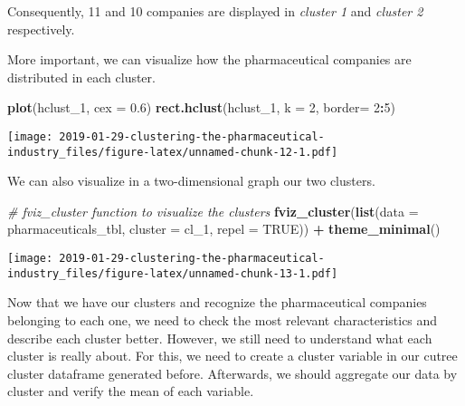\documentclass[]{article}
\newenvironment{Shaded}{\begin{snugshade}}{\end{snugshade}}
\newcommand{\KeywordTok}[1]{\textcolor[rgb]{0.13,0.29,0.53}{\textbf{#1}}}
\newcommand{\DataTypeTok}[1]{\textcolor[rgb]{0.13,0.29,0.53}{#1}}
\newcommand{\DecValTok}[1]{\textcolor[rgb]{0.00,0.00,0.81}{#1}}
\newcommand{\FloatTok}[1]{\textcolor[rgb]{0.00,0.00,0.81}{#1}}
\newcommand{\StringTok}[1]{\textcolor[rgb]{0.31,0.60,0.02}{#1}}
\newcommand{\CommentTok}[1]{\textcolor[rgb]{0.56,0.35,0.01}{\textit{#1}}}
\newcommand{\OtherTok}[1]{\textcolor[rgb]{0.56,0.35,0.01}{#1}}
\newcommand{\OperatorTok}[1]{\textcolor[rgb]{0.81,0.36,0.00}{\textbf{#1}}}
\newcommand{\NormalTok}[1]{#1}
\begin{document}
Consequently, 11 and 10 companies are displayed in \emph{cluster 1} and
\emph{cluster 2} respectively.

More important, we can visualize how the pharmaceutical companies are
distributed in each cluster.

\begin{Shaded}
\begin{Highlighting}[]
\KeywordTok{plot}\NormalTok{(hclust_}\DecValTok{1}\NormalTok{, }\DataTypeTok{cex =} \FloatTok{0.6}\NormalTok{)}
\KeywordTok{rect.hclust}\NormalTok{(hclust_}\DecValTok{1}\NormalTok{, }\DataTypeTok{k =} \DecValTok{2}\NormalTok{, }\DataTypeTok{border=} \DecValTok{2}\OperatorTok{:}\DecValTok{5}\NormalTok{)}
\end{Highlighting}
\end{Shaded}

\texttt{[image: 2019-01-29-clustering-the-pharmaceutical-industry\_files/figure-latex/unnamed-chunk-12-1.pdf]}

We can also visualize in a two-dimensional graph our two clusters.

\begin{Shaded}
\begin{Highlighting}[]
\CommentTok{# fviz_cluster function to visualize the clusters}
\KeywordTok{fviz_cluster}\NormalTok{(}\KeywordTok{list}\NormalTok{(}\DataTypeTok{data =}\NormalTok{ pharmaceuticals_tbl, }\DataTypeTok{cluster =}\NormalTok{ cl_}\DecValTok{1}\NormalTok{, }\DataTypeTok{repel =} \OtherTok{TRUE}\NormalTok{)) }\OperatorTok{+}
\StringTok{  }\KeywordTok{theme_minimal}\NormalTok{()}
\end{Highlighting}
\end{Shaded}

\texttt{[image: 2019-01-29-clustering-the-pharmaceutical-industry\_files/figure-latex/unnamed-chunk-13-1.pdf]}

Now that we have our clusters and recognize the pharmaceutical companies
belonging to each one, we need to check the most relevant
characteristics and describe each cluster better. However, we still need
to understand what each cluster is really about. For this, we need to
create a cluster variable in our cutree cluster dataframe generated
before. Afterwards, we should aggregate our data by cluster and verify
the mean of each variable.

\begin{Shaded}
\end{Shaded}
\end{document}
